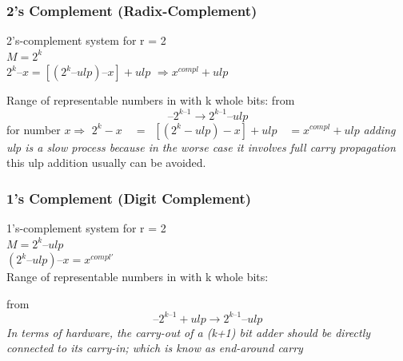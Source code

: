 \subsubsection{2's Complement (Radix-Complement)}
2's-complement system for r = 2\\
\( M = 2^{k} \)\\
\( 2^{k} – x = [(2^{k} – ulp) – x] + ulp       \)    
\( \Rightarrow x^{compl }+ ulp \)

Range of representable numbers in with k whole bits:
from \[–2^{k–1} \to  2^{k–1} – ulp\]
for number $x \Longrightarrow $ \(2^{k}-x\quad=\,\,\,[(2^{k}-ulp)-x]+ulp\quad=x^{compl}+ulp\)    
\textit{adding ulp is a slow process because in the worse case it involves full carry propagation}\\
this ulp addition usually can be avoided.
\subsubsection{1's Complement (Digit Complement)}
1's-complement system for r = 2\\
\(M = 2^{k} – ulp \)\\
\((2^{k} – ulp) – x = x^{compl'} \)\\
Range of representable numbers in with k whole bits:

from \[–2^{k–1} + ulp \to 2^{k–1} – ulp \]
\emph{In terms of hardware, the carry-out of a (k+1) bit adder should be directly connected to its carry-in;  which is  know as end-around carry }
